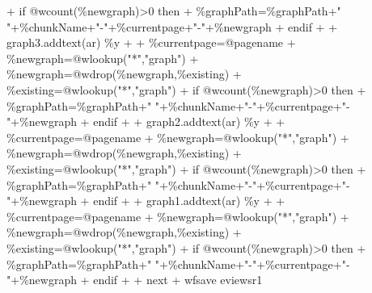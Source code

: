 \documentclass[
]{article}
\newenvironment{Shaded}{\begin{snugshade}}{\end{snugshade}}
\newcommand{\NormalTok}[1]{#1}
\begin{document}
\begin{Shaded}
\begin{Highlighting}[]
\NormalTok{+   if @wcount(\%newgraph)\textgreater{}0 then}
\NormalTok{+   \%graphPath=\%graphPath+" "+\%chunkName+"{-}"+\%currentpage+"{-}"+\%newgraph}
\NormalTok{+   endif}
\NormalTok{+  }
\NormalTok{+ graph3.addtext(ar) \%y}
\NormalTok{+ }
\NormalTok{+   \%currentpage=@pagename}
\NormalTok{+   \%newgraph=@wlookup("*","graph")}
\NormalTok{+   \%newgraph=@wdrop(\%newgraph,\%existing)}
\NormalTok{+   \%existing=@wlookup("*","graph")}
\NormalTok{+   if @wcount(\%newgraph)\textgreater{}0 then}
\NormalTok{+   \%graphPath=\%graphPath+" "+\%chunkName+"{-}"+\%currentpage+"{-}"+\%newgraph}
\NormalTok{+   endif}
\NormalTok{+  }
\NormalTok{+ graph2.addtext(ar) \%y}
\NormalTok{+ }
\NormalTok{+   \%currentpage=@pagename}
\NormalTok{+   \%newgraph=@wlookup("*","graph")}
\NormalTok{+   \%newgraph=@wdrop(\%newgraph,\%existing)}
\NormalTok{+   \%existing=@wlookup("*","graph")}
\NormalTok{+   if @wcount(\%newgraph)\textgreater{}0 then}
\NormalTok{+   \%graphPath=\%graphPath+" "+\%chunkName+"{-}"+\%currentpage+"{-}"+\%newgraph}
\NormalTok{+   endif}
\NormalTok{+  }
\NormalTok{+ graph1.addtext(ar) \%y}
\NormalTok{+ }
\NormalTok{+   \%currentpage=@pagename}
\NormalTok{+   \%newgraph=@wlookup("*","graph")}
\NormalTok{+   \%newgraph=@wdrop(\%newgraph,\%existing)}
\NormalTok{+   \%existing=@wlookup("*","graph")}
\NormalTok{+   if @wcount(\%newgraph)\textgreater{}0 then}
\NormalTok{+   \%graphPath=\%graphPath+" "+\%chunkName+"{-}"+\%currentpage+"{-}"+\%newgraph}
\NormalTok{+   endif}
\NormalTok{+  }
\NormalTok{+ next}
\NormalTok{+ wfsave eviewsr1}
\end{Highlighting}
\end{Shaded}
\end{document}
